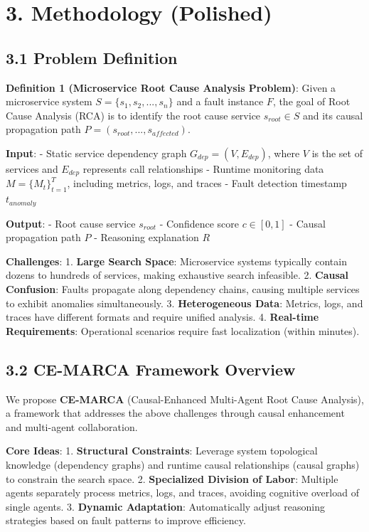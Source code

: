 \hypertarget{methodology-polished}{%
\section{3. Methodology (Polished)}\label{methodology-polished}}

\hypertarget{problem-definition}{%
\subsection{3.1 Problem Definition}\label{problem-definition}}

\textbf{Definition 1 (Microservice Root Cause Analysis Problem)}: Given
a microservice system \(S = \{s_1, s_2, ..., s_n\}\) and a fault
instance \(F\), the goal of Root Cause Analysis (RCA) is to identify the
root cause service \(s_{root} \in S\) and its causal propagation path
\(P = (s_{root}, ..., s_{affected})\).

\textbf{Input}: - Static service dependency graph
\(G_{dep} = (V, E_{dep})\), where \(V\) is the set of services and
\(E_{dep}\) represents call relationships - Runtime monitoring data
\(M = \{M_t\}_{t=1}^T\), including metrics, logs, and traces - Fault
detection timestamp \(t_{anomaly}\)

\textbf{Output}: - Root cause service \(s_{root}\) - Confidence score
\(c \in [0, 1]\) - Causal propagation path \(P\) - Reasoning explanation
\(R\)

\textbf{Challenges}: 1. \textbf{Large Search Space}: Microservice
systems typically contain dozens to hundreds of services, making
exhaustive search infeasible. 2. \textbf{Causal Confusion}: Faults
propagate along dependency chains, causing multiple services to exhibit
anomalies simultaneously. 3. \textbf{Heterogeneous Data}: Metrics, logs,
and traces have different formats and require unified analysis. 4.
\textbf{Real-time Requirements}: Operational scenarios require fast
localization (within minutes).

\hypertarget{ce-marca-framework-overview}{%
\subsection{3.2 CE-MARCA Framework
Overview}\label{ce-marca-framework-overview}}

We propose \textbf{CE-MARCA} (Causal-Enhanced Multi-Agent Root Cause
Analysis), a framework that addresses the above challenges through
causal enhancement and multi-agent collaboration.

\textbf{Core Ideas}: 1. \textbf{Structural Constraints}: Leverage system
topological knowledge (dependency graphs) and runtime causal
relationships (causal graphs) to constrain the search space. 2.
\textbf{Specialized Division of Labor}: Multiple agents separately
process metrics, logs, and traces, avoiding cognitive overload of single
agents. 3. \textbf{Dynamic Adaptation}: Automatically adjust reasoning
strategies based on fault patterns to improve efficiency.

